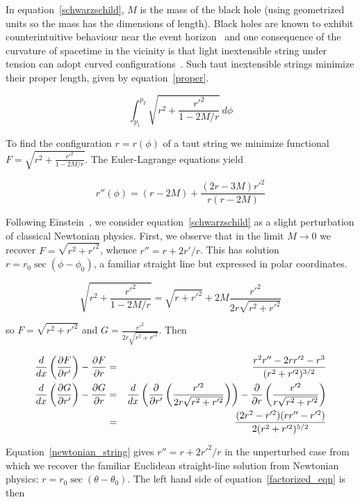 \documentclass[pdflatex,sn-mathphys-num]{sn-jnl}%
\theoremstyle{thmstyleone}%
\theoremstyle{thmstyletwo}%
\theoremstyle{thmstylethree}%
\begin{document}
In equation~\ref{schwarzschild}, $M$ is the mass of the black hole
(using geometrized units so the mass has the dimensions of length).
Black holes are known to exhibit counterintuitive behaviour near the
event horizon~\cite{allen1990} and one consequence of the
curvature of spacetime in the vicinity is that light inextensible
string under tension can adopt curved
configurations~\cite{hankin2021}.  Such taut inextensible strings
minimize their proper length, given by equation~\ref{proper}.

\begin{equation}\label{proper}
  \int_{p_1}^{p_2}\sqrt{r^2 + \frac{r'^2}{1-2M/r}}\,d\phi
\end{equation}

To find the configuration $r=r(\phi)$ of a taut string we minimize
functional $F=\sqrt{r^2 + \frac{r'^2}{1-2M/r}}$.  The Euler-Lagrange
equations yield

\begin{equation}\label{eulerstring}
  r''(\phi) = (r-2M) + \frac{(2r-3M)r'^2}{r(r-2M)}
\end{equation}


Following Einstein~\cite{einstein1915}, we consider
equation~\ref{schwarzschild} as a slight perturbation of classical
Newtonian physics.  First, we observe that in the limit
$M\longrightarrow 0$ we recover $F=\sqrt{r^2+r'^2}$, whence $r'' = r +
2r'/r$.  This has solution $r=r_0\sec(\phi-\phi_0)$, a familiar
straight line but expressed in polar coordinates.

\begin{equation}
\sqrt{r^2 + \frac{r'^2}{1-2M/r}}=\sqrt{r+r'^2} + 2M\frac{r'^2}{2r\sqrt{r^2 + r'^2}}
\end{equation}
  
so $F=\sqrt{r^2+r'^2}$ and $G=\frac{r'^2}{2r\sqrt{r^2+r'^2}}$.  Then

\begin{eqnarray}\label{newtonian_string}
\frac{d}{dx}\left(\frac{\partial{F}}{\partial{r'}}\right) -\frac{\partial{F}}{\partial{r}} &=& \frac{r^2r''- 2rr'^2 -r^3}{(r^2 +r'^2)^{3/2}}\\
\frac{d}{dx}\left(\frac{\partial{G}}{\partial{r'}}\right) -\frac{\partial{G}}{\partial{r}} &=&
\frac{d}{dx}\left(\frac{\partial}{\partial r'}\left(\frac{r'^2}{2r\sqrt{r^2+r'^2}}\right)\right)
- \frac{\partial}{\partial
  r}\left(\frac{r'^2}{r\sqrt{r^2+r'^2}}\right)\\
&=& \frac{(2r^2-r'^2)(rr''-r'^2)}{2(r^2+r'^2)^{5/2}}
\end{eqnarray}

Equation~\ref{newtonian_string} gives $r'' = r + 2r'^2/r$ in the
unperturbed case from which we recover the familiar Euclidean
straight-line solution from Newtonian physics:
$r=r_0\sec(\theta-\theta_0)$.  The left hand side of
equation~\ref{factorized_eqn} is then
\end{document}
